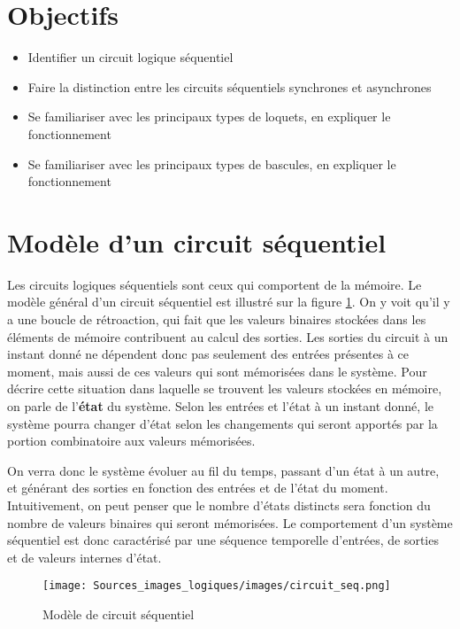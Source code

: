 \documentclass[letter, oneside]{book}
\begin{document}
\section{Objectifs}
\label{sec:org5889105}
\begin{itemize}
\item Identifier un circuit logique séquentiel
\item Faire la distinction entre les circuits séquentiels synchrones et asynchrones
\item Se familiariser avec les principaux types de loquets, en expliquer
le fonctionnement
\item Se familiariser avec les principaux types de bascules, en expliquer
le fonctionnement
\end{itemize}

\section{Modèle d'un circuit séquentiel}
\label{sec:org9385cbd}

Les circuits logiques séquentiels sont ceux qui comportent de la
mémoire. Le modèle général d'un circuit séquentiel est illustré sur la
figure \ref{fig:org296e48e}. On y voit qu'il y a une boucle de rétroaction,
qui fait que les valeurs binaires stockées dans les éléments de
mémoire contribuent au calcul des sorties. Les sorties du circuit à un
instant donné ne dépendent donc pas seulement des entrées présentes à
ce moment, mais aussi de ces valeurs qui sont mémorisées dans le
système. Pour décrire cette situation dans laquelle se trouvent les
valeurs stockées en mémoire, on parle de l'\textbf{état} du système. Selon
les entrées et l'état à un instant donné, le système pourra changer
d'état selon les changements qui seront apportés par la portion
combinatoire aux valeurs mémorisées.

On verra donc le système évoluer au fil du temps, passant d'un état à
un autre, et générant des sorties en fonction des entrées et de l'état
du moment. Intuitivement, on peut penser que le nombre d'états
distincts sera fonction du nombre de valeurs binaires qui seront
mémorisées. Le comportement d'un système séquentiel est donc
caractérisé par une séquence temporelle d'entrées, de sorties et de
valeurs internes d'état.

\begin{figure}[htbp]
\centering
\texttt{[image: Sources\_images\_logiques/images/circuit\_seq.png]}
\caption{\label{fig:org296e48e}Modèle de circuit séquentiel}
\end{figure}
\end{document}
